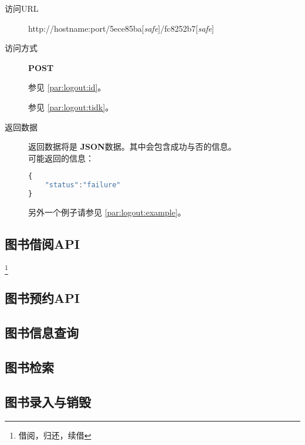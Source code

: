 \documentclass[UTF8]{article}
\def\safe{[\textit{safe}]}
\def\POST{\textbf{POST}}
\def\bfJSON{\textbf{JSON}}
\def\viaurl#1{\item[访问URL] #1}
\def\viareq#1{\item[访问方式] #1}
\def\rtdata{\item[返回数据]}
\begin{document}
        \begin{description}
            \viaurl http://hostname:port/5ece85ba\safe/fc8252b7\safe

            \viareq \POST

            参见 \ref{par:logout:id}。

            参见 \ref{par:logout:tidk}。


            \rtdata 返回数据将是 \bfJSON 数据。其中会包含成功与否的信息。
            \\可能返回的信息：
            \begin{lstlisting}[language=JavaScript]
{
    "status":"failure"
}
            \end{lstlisting}
            另外一个例子请参见 \ref{par:logout:example}。
        \end{description}


        \subsection{图书借阅API}
        \footnote{借阅，归还，续借}
        \subsection{图书预约API}
        \subsection{图书信息查询}
        \subsection{图书检索}
        \subsection{图书录入与销毁}
\end{document}
